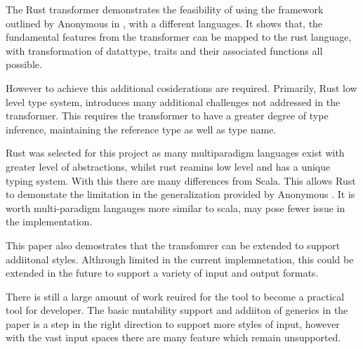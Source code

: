 \documentclass[ oneside,%
                    author={James Elgar},
                    degree={MEng},
                     title={Bidirectional transformer between functional and \\ object-oriented programming in Rust},
                  subtitle={}]{dissertation}
\newcommand{\weixin}{Anonymous }
\begin{document}
The Rust transformer demonstrates the feasibility of using the framework outlined by \weixin in \cite{food}, with a different languages. It shows that, the fundamental features from the transformer can be mapped to the rust language, with transformation of datattype, traits and their associated functions all possible. 

However to achieve this additional cosiderations are required. Primarily, Rust low level type system, introduces many additional challenges not addressed in the \cite{food} transformer. This requires the transformer to have a greater degree of type inference, maintaining the reference type as well as type name.

Rust was selected for this project as many multiparadigm languages exist with greater level of abstractions, whilst rust reamins low level and has a unique typing system. With this there are many differences from Scala. This allows Rust to demonstate the limitation in the generalization provided by 
\weixin. It is worth multi-paradigm langauges more similar to scala, may pose fewer issue in the implementation.

This paper also demostrates that the transfomrer can be extended to support addiitonal styles. Althrough limited in the current implemnetation, this could be extended in the future to support a variety of input and output formats.

There is still a large amount of work reuired for the tool to become a practical tool for developer. The basic mutability support and addiiton of generics in the paper is a step in the right direction to support more styles of input, however with the vast input spaces there are many feature which remain unsupported.

\end{document}
